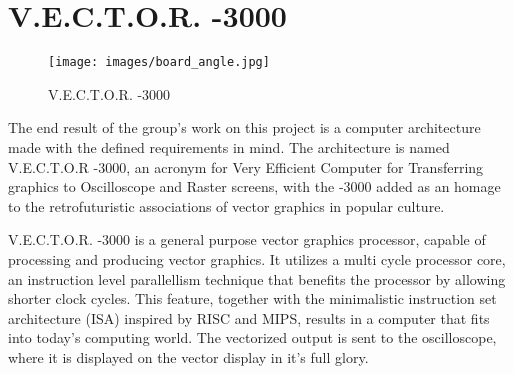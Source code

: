 \chapter{V.E.C.T.O.R. -3000}

\begin{figure}[H]
    \texttt{[image: images/board\_angle.jpg]}
    \caption{V.E.C.T.O.R. -3000}
    \label{fig:board-angle}
\end{figure}

The end result of the group's work on this project is a computer architecture made with the defined requirements in mind.
The architecture is named V.E.C.T.O.R -3000, an acronym for Very Efficient Computer for Transferring graphics to Oscilloscope and Raster screens, with the -3000 added as an homage to the retrofuturistic associations of vector graphics in popular culture.

V.E.C.T.O.R. -3000 is a general purpose vector graphics processor, capable of processing and producing vector graphics. 
It utilizes a multi cycle processor core, an instruction level parallellism technique that benefits the processor by allowing shorter clock cycles.
This feature, together with the minimalistic instruction set architecture (ISA) inspired by RISC\cite{risc} and MIPS\cite{mips}, results in a computer that fits into today's computing world.
The vectorized output is sent to the oscilloscope, where it is displayed on the vector display in it's full glory.